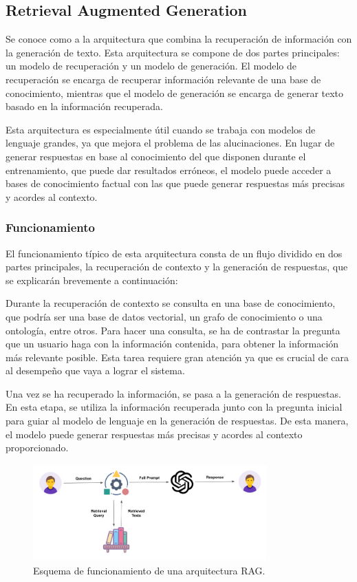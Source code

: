 \subsection{Retrieval Augmented Generation}
Se conoce como  a la arquitectura que combina la recuperación de información con la generación de texto. Esta arquitectura se compone de dos partes principales: un modelo de recuperación y un modelo de generación. El modelo de recuperación se encarga de recuperar información relevante de una base de conocimiento, mientras que el modelo de generación se encarga de generar texto basado en la información recuperada.

Esta arquitectura es especialmente útil cuando se trabaja con modelos de lenguaje grandes, ya que mejora el problema de las alucinaciones. En lugar de generar respuestas en base al conocimiento del que disponen durante el entrenamiento, que puede dar resultados erróneos, el modelo puede acceder a bases de conocimiento factual con las que puede generar respuestas más precisas y acordes al contexto.

\subsubsection{Funcionamiento}
El funcionamiento típico de esta arquitectura consta de un flujo dividido en dos partes principales, la recuperación de contexto y la generación de respuestas, que se explicarán brevemente a continuación:

Durante la recuperación de contexto se consulta en una base de conocimiento, que podría ser una base de datos vectorial, un grafo de conocimiento o una ontología, entre otros. Para hacer una consulta, se ha de contrastar la pregunta que un usuario haga con la información contenida, para obtener la información más relevante posible. Esta tarea requiere gran atención ya que es crucial de cara al desempeño que vaya a lograr el sistema.

Una vez se ha recuperado la información, se pasa a la generación de respuestas. En esta etapa, se utiliza la información recuperada junto con la pregunta inicial para guiar al modelo de lenguaje en la generación de respuestas. De esta manera, el modelo puede generar respuestas más precisas y acordes al contexto proporcionado.

\begin{figure}[!h]
    \centering
    \includegraphics[width=0.8\textwidth]{images/rag.png}
    \caption{Esquema de funcionamiento de una arquitectura RAG.}
    \label{fig:rag}
\end{figure}
